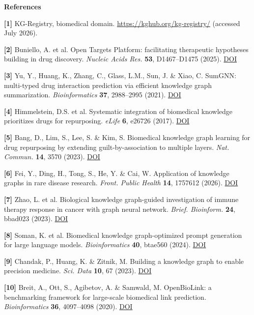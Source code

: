 \textbf{References}

\textbf{{[}1{]}} KG-Registry, biomedical domain. \url{https://kghub.org/kg-registry/} (accessed July 2026).

\textbf{{[}2{]}} Buniello, A. et al. Open Targets Platform: facilitating therapeutic hypotheses building in drug discovery. \emph{Nucleic Acids Res.} \textbf{53}, D1467--D1475 (2025). \href{https://doi.org/10.1093/nar/gkae1128}{DOI}

\textbf{{[}3{]}} Yu, Y., Huang, K., Zhang, C., Glass, L.M., Sun, J. \& Xiao, C. SumGNN: multi-typed drug interaction prediction via efficient knowledge graph summarization. \emph{Bioinformatics} \textbf{37}, 2988--2995 (2021). \href{https://doi.org/10.1093/bioinformatics/btab207}{DOI}

\textbf{{[}4{]}} Himmelstein, D.S. et al. Systematic integration of biomedical knowledge prioritizes drugs for repurposing. \emph{eLife} \textbf{6}, e26726 (2017). \href{https://doi.org/10.7554/eLife.26726}{DOI}

\textbf{{[}5{]}} Bang, D., Lim, S., Lee, S. \& Kim, S. Biomedical knowledge graph learning for drug repurposing by extending guilt-by-association to multiple layers. \emph{Nat. Commun.} \textbf{14}, 3570 (2023). \href{https://doi.org/10.1038/s41467-023-39301-y}{DOI}

\textbf{{[}6{]}} Fei, Y., Ding, H., Tong, S., He, Y. \& Cai, W. Application of knowledge graphs in rare disease research. \emph{Front. Public Health} \textbf{14}, 1757612 (2026). \href{https://doi.org/10.3389/fpubh.2026.1757612}{DOI}

\textbf{{[}7{]}} Zhao, L. et al. Biological knowledge graph-guided investigation of immune therapy response in cancer with graph neural network. \emph{Brief. Bioinform.} \textbf{24}, bbad023 (2023). \href{https://doi.org/10.1093/bib/bbad023}{DOI}

\textbf{{[}8{]}} Soman, K. et al. Biomedical knowledge graph-optimized prompt generation for large language models. \emph{Bioinformatics} \textbf{40}, btae560 (2024). \href{https://doi.org/10.1093/bioinformatics/btae560}{DOI}

\textbf{{[}9{]}} Chandak, P., Huang, K. \& Zitnik, M. Building a knowledge graph to enable precision medicine. \emph{Sci. Data} \textbf{10}, 67 (2023). \href{https://doi.org/10.1038/s41597-023-01960-3}{DOI}

\textbf{{[}10{]}} Breit, A., Ott, S., Agibetov, A. \& Samwald, M. OpenBioLink: a benchmarking framework for large-scale biomedical link prediction. \emph{Bioinformatics} \textbf{36}, 4097--4098 (2020). \href{https://doi.org/10.1093/bioinformatics/btaa274}{DOI}

